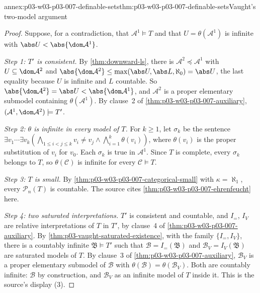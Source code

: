 \begin{annexitem}{annex:p03-w03-p03-007-definable-sets}{thm:p03-w03-p03-007-definable-sets}{Vaught's two-model argument}
\begin{proof}
Suppose, for a contradiction, that \(\mathcal A^1\models T\) and that
\(U=\theta(\mathcal A^1)\) is infinite with \(\abs U<\abs{\dom\mathcal A^1}\).

\emph{Step 1: \(T'\) is consistent.} By \cref{thm:downward-ls}, there is
\(\mathcal A^2\preccurlyeq\mathcal A^1\) with \(U\subseteq\dom\mathcal A^2\)
and \(\abs{\dom\mathcal A^2}\le\max(\abs U,\abs L,\aleph_0)=\abs U\), the
last equality because \(U\) is infinite and \(L\) countable. So
\(\abs{\dom\mathcal A^2}=\abs U<\abs{\dom\mathcal A^1}\), and
\(\mathcal A^2\) is a proper elementary submodel containing
\(\theta(\mathcal A^1)\). By clause~2 of
\cref{thm:p03-w03-p03-007-auxiliary},
\((\mathcal A^1,\dom\mathcal A^2)\models T'\).

\emph{Step 2: \(\theta\) is infinite in every model of \(T\).} For
\(k\ge1\), let \(\sigma_k\) be the sentence
\(\exists v_1\cdots\exists v_k
 (\bigwedge_{1\le i<j\le k}v_i\neq v_j\land\bigwedge_{i=1}^k\theta(v_i))\),
where \(\theta(v_i)\) is the proper substitution of \(v_i\) for \(v_0\).
Each \(\sigma_k\) is true in \(\mathcal A^1\). Since \(T\) is complete, every
\(\sigma_k\) belongs to \(T\), so \(\theta(\mathcal C)\) is infinite for every
\(\mathcal C\models T\).

\emph{Step 3: \(T\) is small.} By
\cref{thm:p03-w03-p03-007-categorical-small} with \(\kappa=\aleph_1\), every
\(\mathcal P_n(T)\) is countable. The source cites
\cref{thm:p03-w03-p03-007-ehrenfeucht} here.

\emph{Step 4: two saturated interpretations.} \(T'\) is consistent and
countable, and \(I_=\), \(I_V\) are relative interpretations of \(T\) in
\(T'\), by clause~4 of \cref{thm:p03-w03-p03-007-auxiliary}. By
\cref{thm:p03-vaught-saturated-existence}, with the family
\(\{I_=,I_V\}\), there is a countably infinite \(\mathfrak B\models T'\) such
that \(\mathcal B=I_=(\mathfrak B)\) and \(\mathcal B_V=I_V(\mathfrak B)\)
are saturated models of \(T\). By clause~3 of
\cref{thm:p03-w03-p03-007-auxiliary}, \(\mathcal B_V\) is a proper elementary
submodel of \(\mathcal B\) with \(\theta(\mathcal B)=\theta(\mathcal B_V)\).
Both are countably infinite: \(\mathcal B\) by construction, and
\(\mathcal B_V\) as an infinite model of \(T\) inside it. This is the source's
display (3).


\end{proof}
\end{annexitem}
